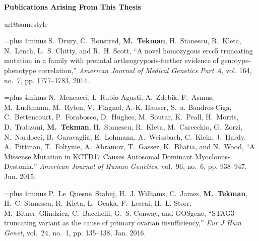 \pagebreak
{\noindent \bf Publications Arising From This Thesis}\\

\begingroup
\renewcommand{\chapter}[2]{}%
\begin{thebibliography}{10}
\providecommand{\url}[1]{#1}
\csname url@samestyle\endcsname
\providecommand{\newblock}{\relax}
\providecommand{\bibinfo}[2]{#2}
\providecommand{\BIBentrySTDinterwordspacing}{\spaceskip=0pt\relax}
\providecommand{\BIBentryALTinterwordstretchfactor}{4}
\providecommand{\BIBentryALTinterwordspacing}{\spaceskip=\fontdimen2\font plus
\BIBentryALTinterwordstretchfactor\fontdimen3\font minus
  \fontdimen4\font\relax}
\providecommand{\BIBforeignlanguage}[2]{{%
\expandafter\ifx\csname l@#1\endcsname\relax
\typeout{** WARNING: IEEEtran.bst: No hyphenation pattern has been}%
\typeout{** loaded for the language `#1'. Using the pattern for}%
\typeout{** the default language instead.}%
\else
\language=\csname l@#1\endcsname
\fi
#2}}
\providecommand{\BIBdecl}{\relax}

\BIBentryALTinterwordspacing
S.~Drury, C.~Boustred, \textbf{M.~Tekman}, H.~Stanescu, R.~Kleta, N.~Lench, L.~S.
  Chitty, and R.~H. Scott, ``A novel homozygous ercc5 truncating mutation in a
  family with prenatal arthrogryposis-further evidence of genotype-phenotype
  correlation,'' \emph{American Journal of Medical Genetics Part A}, vol. 164,
  no.~7, pp. 1777--1783, 2014.
\BIBentrySTDinterwordspacing

\BIBentryALTinterwordspacing
N.~Mencacci, I.~Rubio-Agusti, A.~Zdebik, F.~Asmus, M.~Ludtmann, M.~Ryten,
  V.~Plagnol, A.-K. Hauser, S.~a. Bandres-Ciga, C.~Bettencourt, P.~Forabosco,
  D.~Hughes, M.~Soutar, K.~Peall, H.~Morris, D.~Trabzuni, \textbf{M.~Tekman},
  H.~Stanescu, R.~Kleta, M.~Carecchio, G.~Zorzi, N.~Nardocci, B.~Garavaglia,
  E.~Lohmann, A.~Weissbach, C.~Klein, J.~Hardy, A.~Pittman, T.~Foltynie,
  A.~Abramov, T.~Gasser, K.~Bhatia, and N.~Wood, ``A {Missense} {Mutation} in
  {KCTD}17 {Causes} {Autosomal} {Dominant} {Myoclonus}-{Dystonia},''
  \emph{American Journal of Human Genetics}, vol.~96, no.~6, pp. 938--947, Jun.
  2015.
\BIBentrySTDinterwordspacing

\BIBentryALTinterwordspacing
P.~Le~Quesne~Stabej, H.~J. Williams, C.~James, \textbf{M.~Tekman}, H.~C. Stanescu,
  R.~Kleta, L.~Ocaka, F.~Lescai, H.~L. Storr, M.~Bitner~Glindzicz,
  C.~Bacchelli, G.~S. Conway, and {GOSgene}, ``{STAG}3 truncating variant as
  the cause of primary ovarian insufficiency,'' \emph{Eur J Hum Genet},
  vol.~24, no.~1, pp. 135--138, Jan. 2016.
\BIBentrySTDinterwordspacing


\end{thebibliography}
